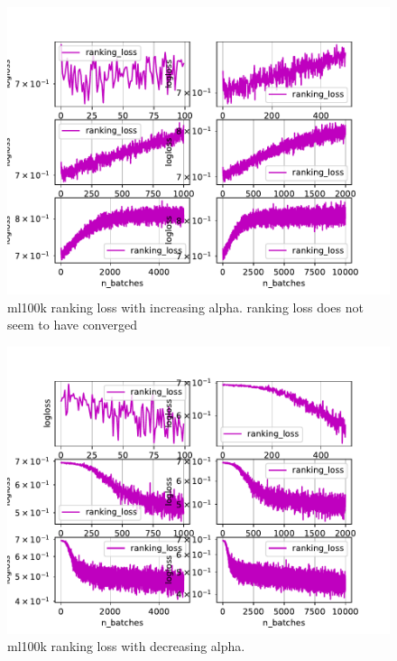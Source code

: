\documentclass{article}
\begin{document}
\begin{figure}[t!]
\begin{center}
\includegraphics[width=1\textwidth]{figures/ml100k/ranking_loss_inc_alpha.pdf}  
\end{center}
\caption{ml100k ranking loss with increasing alpha. ranking loss does not seem to have converged}
\label{fig:ProperCover}
\end{figure}

\begin{figure}[t!]
\begin{center}
\includegraphics[width=1\textwidth]{figures/ml100k/ranking_loss_dec_alpha.pdf}  
\end{center}
\caption{ml100k ranking loss with decreasing alpha.}
\label{fig:ProperCover}
\end{figure}
\end{document}
